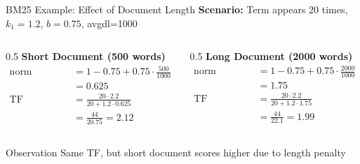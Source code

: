 \documentclass[aspectratio=169]{beamer}
\begin{document}
\begin{frame}{BM25 Example: Effect of Document Length}
\textbf{Scenario:} Term appears 20 times, $k_1=1.2$, $b=0.75$, avgdl=1000

\vspace{1em}

\begin{columns}
\begin{column}{0.5\textwidth}
\textbf{Short Document (500 words)}
\begin{align*}
\text{norm} &= 1 - 0.75 + 0.75 \cdot \frac{500}{1000} \\
&= 0.625 \\
\text{TF component} &= \frac{20 \cdot 2.2}{20 + 1.2 \cdot 0.625} \\
&= \frac{44}{20.75} = 2.12
\end{align*}
\end{column}

\begin{column}{0.5\textwidth}
\textbf{Long Document (2000 words)}
\begin{align*}
\text{norm} &= 1 - 0.75 + 0.75 \cdot \frac{2000}{1000} \\
&= 1.75 \\
\text{TF component} &= \frac{20 \cdot 2.2}{20 + 1.2 \cdot 1.75} \\
&= \frac{44}{22.1} = 1.99
\end{align*}
\end{column}
\end{columns}

\vspace{1em}

\begin{alertblock}{Observation}
Same TF, but short document scores higher due to length penalty
\end{alertblock}
\end{frame}
\end{document}
